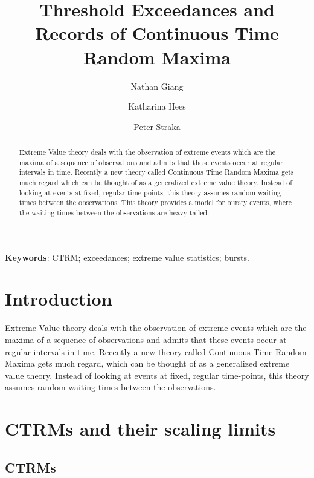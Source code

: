 \documentclass[12pt, a4paper]{article}
\title{Threshold Exceedances and Records of Continuous Time Random Maxima}
\author{Nathan Giang \and Katharina Hees \and Peter Straka}
\newcommand{\1}{\mathbf 1}
\begin{document}
\maketitle

\begin{abstract}
Extreme Value theory deals with the observation of extreme events which are the maxima of a sequence of observations and admits that these events occur at regular intervals in time. Recently a new theory called Continuous Time Random Maxima gets much regard which can be thought of as a generalized extreme value theory. Instead of looking at events at fixed, regular time-points, this theory assumes random waiting times between the observations. This theory provides a model for bursty events, where the waiting times between the observations are heavy tailed.\\

\end{abstract}

{\bf Keywords}: CTRM; exceedances; extreme value statistics; bursts.


\setlength{\parindent}{0pt}

\section{Introduction}
Extreme Value theory deals with the observation of extreme events which are the maxima of a sequence of observations and admits that these events occur at regular intervals in time. Recently a new theory called Continuous Time Random Maxima gets much regard, which can be thought of as a generalized extreme value theory. Instead of looking at events at fixed, regular time-points, this theory assumes random waiting times between the observations.


\section{CTRMs and their scaling limits}

\subsection{CTRMs}
\end{document}

